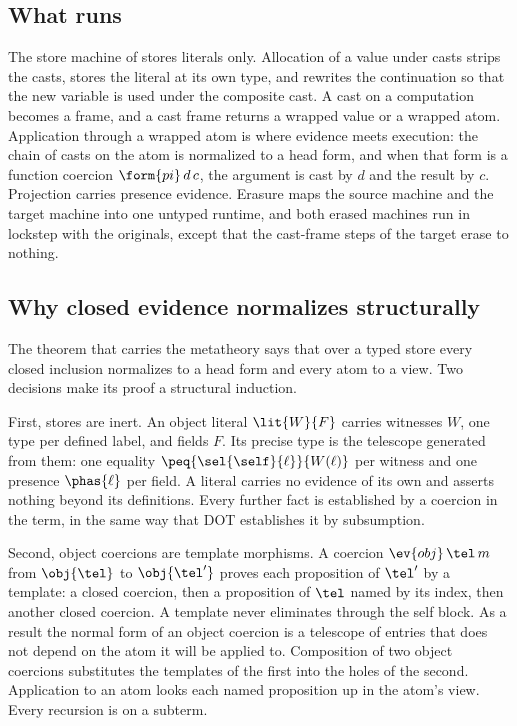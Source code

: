 \subsection{What runs}

The store machine of \FCdot stores literals only. Allocation of a value under casts strips the casts, stores the literal at its own type, and rewrites the continuation so that the new variable is used under the composite cast. A cast on a computation becomes a frame, and a cast frame returns a wrapped value or a wrapped atom. Application through a wrapped atom is where evidence meets execution: the chain of casts on the atom is normalized to a head form, and when that form is a function coercion $\form{pi}\,d\,c$, the argument is cast by $d$ and the result by $c$. Projection carries presence evidence. Erasure maps the source machine and the target machine into one untyped runtime, and both erased machines run in lockstep with the originals, except that the cast-frame steps of the target erase to nothing.

\subsection{Why closed evidence normalizes structurally}\label{sec:why-structural}

The theorem that carries the metatheory says that over a typed store every closed inclusion normalizes to a head form and every atom to a view. Two decisions make its proof a structural induction.

First, stores are inert. An object literal $\lit{W}{F}$ carries witnesses $W$, one type per defined label, and fields $F$. Its precise type is the telescope generated from them: one equality $\peq{\sel{\self}{\ell}}{W(\ell)}$ per witness and one presence $\phas{\ell}$ per field. A literal carries no evidence of its own and asserts nothing beyond its definitions. Every further fact is established by a coercion in the term, in the same way that DOT establishes it by subsumption.

Second, object coercions are template morphisms. A coercion $\ev{obj}\,\tel\,m$ from $\obj{\tel}$ to $\obj{\tel'}$ proves each proposition of $\tel'$ by a template: a closed coercion, then a proposition of $\tel$ named by its index, then another closed coercion. A template never eliminates through the self block. As a result the normal form of an object coercion is a telescope of entries that does not depend on the atom it will be applied to. Composition of two object coercions substitutes the templates of the first into the holes of the second. Application to an atom looks each named proposition up in the atom's view. Every recursion is on a subterm.

